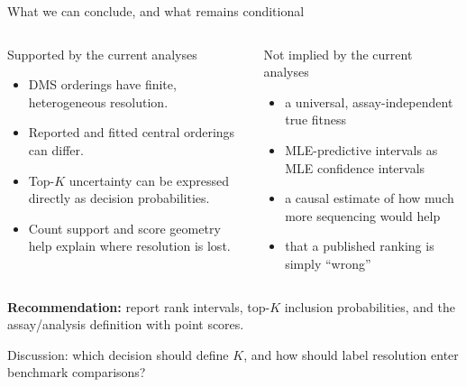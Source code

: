 \documentclass[aspectratio=169,11pt]{beamer}
\newcommand{\tightitems}{\setlength{\itemsep}{0.35em}\setlength{\parskip}{0pt}}
\begin{document}
\begin{frame}{What we can conclude, and what remains conditional}
  \footnotesize
  \begin{columns}[T,onlytextwidth]
      \begin{block}{Supported by the current analyses}
        \begin{itemize}\tightitems
          \item DMS orderings have finite, heterogeneous resolution.
          \item Reported and fitted central orderings can differ.
          \item Top-$K$ uncertainty can be expressed directly as decision probabilities.
          \item Count support and score geometry help explain where resolution is lost.
        \end{itemize}
      \end{block}
      \begin{block}{Not implied by the current analyses}
        \begin{itemize}\tightitems
          \item a universal, assay-independent true fitness
          \item MLE-predictive intervals as MLE confidence intervals
          \item a causal estimate of how much more sequencing would help
          \item that a published ranking is simply ``wrong''
        \end{itemize}
      \end{block}
  \end{columns}

  \begin{callout}
    \small \textbf{Recommendation:} report rank intervals, top-$K$ inclusion probabilities, and the assay/analysis definition with point scores.
  \end{callout}

  \centering
  \scriptsize\color{graytext}Discussion: which decision should define $K$, and how should label resolution enter benchmark comparisons?
\end{frame}
\end{document}
